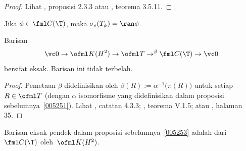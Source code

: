 \begin{proof} Lihat \cite{HigsonR:2000}, proposisi 2.3.3 atau \cite{Murphy:1990},
teorema 3.5.11.  \ns
\end{proof}

\begin{cor} Jika $\phi \in \fml C(\T)$, maka $\sigma_e(T_\phi) = \ran\phi$.
\end{cor}

\begin{prop}\label{005253} Barisan
   \[ \vc 0 \to \ofml K(H^2) \to \ofml T \to^\beta \fml C(\T) \to \vc 0 \]
bersifat eksak. Barisan ini tidak terbelah.
\end{prop}

\begin{proof} Pemetaan $\beta$ didefinisikan oleh $\beta(R) := \alpha^{-1}\bigl(\pi(R)\bigr)$ untuk
setiap $R \in \ofml T$ (dengan $\alpha$ isomorfisme yang didefinisikan dalam
proposisi sebelumnya~\ref{005251}). Lihat \cite{Arveson:2002}, catatan 4.3.3; \cite{Davidson:1996},
teorema V.1.5; atau \cite{HigsonR:2000}, halaman 35. \ns
\end{proof}

\begin{defn}\label{0052531} Barisan eksak pendek dalam proposisi sebelumnya~\ref{005253}
adalah
 dari $\fml C(\T)$ oleh~$\ofml K(H^2)$.
\end{defn}

